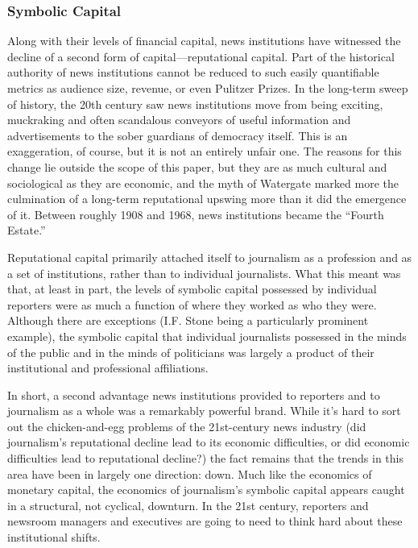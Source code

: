 \subsubsection{Symbolic Capital}
Along with their levels of financial capital, news institutions have witnessed the
decline of a second form of capital—reputational capital. Part of the historical
authority of news institutions cannot be reduced to such easily quantifiable metrics
as audience size, revenue, or even Pulitzer Prizes. In the long-term sweep of
history, the 20th century saw news institutions move from being exciting, muckraking
and often scandalous conveyors of useful information and advertisements
to the sober guardians of democracy itself. This is an exaggeration, of course, but
it is not an entirely unfair one. The reasons for this change lie outside the scope
of this paper, but they are as much cultural and sociological as they are economic,
and the myth of Watergate marked more the culmination of a long-term reputational
upswing more than it did the emergence of it. Between roughly 1908 and
1968, news institutions became the ``Fourth Estate.''

Reputational capital primarily attached itself to journalism as a profession and
as a set of institutions, rather than to individual journalists. What this meant was
that, at least in part, the levels of symbolic capital possessed by individual reporters
were as much a function of where they worked as who they were. Although there are exceptions (I.F. Stone being a particularly prominent example), the
symbolic capital that individual journalists possessed in the minds of the public
and in the minds of politicians was largely a product of their institutional and
professional affiliations.

In short, a second advantage news institutions provided to reporters and to journalism
as a whole was a remarkably powerful brand. While it’s hard to sort out the
chicken-and-egg problems of the 21st-century news industry (did journalism’s
reputational decline lead to its economic difficulties, or did economic difficulties
lead to reputational decline?) the fact remains that the trends in this area have been
in largely one direction: down. Much like the economics of monetary capital,
the economics of journalism’s symbolic capital appears caught in a structural, not
cyclical, downturn. In the 21st century, reporters and newsroom managers and
executives are going to need to think hard about these institutional shifts.

